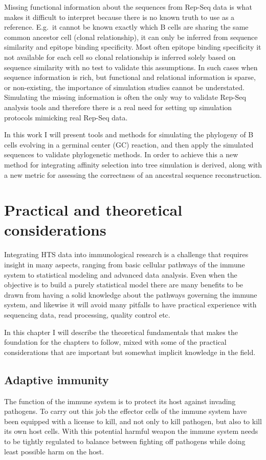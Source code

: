 Missing functional information about the sequences from Rep-Seq data is what makes it difficult to interpret because there is no known truth to use as a reference.
E.g.\ it cannot be known exactly which B cells are sharing the same common ancestor cell (clonal relationship), it can only be inferred from sequence similarity and epitope binding specificity.
Most often epitope binding specificity it not available for each cell so clonal relationship is inferred solely based on sequence similarity with no test to validate this assumptions.
In such cases when sequence information is rich, but functional and relational information is sparse, or non-existing, the importance of simulation studies cannot be understated.
Simulating the missing information is often the only way to validate Rep-Seq analysis tools and therefore there is a real need for setting up simulation protocols mimicking real Rep-Seq data.

In this work I will present tools and methods for simulating the phylogeny of B cells evolving in a germinal center (GC) reaction, and then apply the simulated sequences to validate phylogenetic methods.
In order to achieve this a new method for integrating affinity selection into tree simulation is derived, along with a new metric for assessing the correctness of an ancestral sequence reconstruction.




\chapter{Practical and theoretical considerations}
Integrating HTS data into immunological research is a challenge that requires insight in many aspects, ranging from basic cellular pathways of the immune system to statistical modeling and advanced data analysis.
Even when the objective is to build a purely statistical model there are many benefits to be drawn from having a solid knowledge about the pathways governing the immune system, and likewise it will avoid many pitfalls to have practical experience with sequencing data, read processing, quality control etc.

In this chapter I will describe the theoretical fundamentals that makes the foundation for the chapters to follow, mixed with some of the practical considerations that are important but somewhat implicit knowledge in the field.



\section{Adaptive immunity}
The function of the immune system is to protect its host against invading pathogens.
To carry out this job the effector cells of the immune system have been equipped with a license to kill, and not only to kill pathogen, but also to kill its own host cells.
With this potential harmful weapon the immune system needs to be tightly regulated to balance between fighting off pathogens while doing least possible harm on the host.

